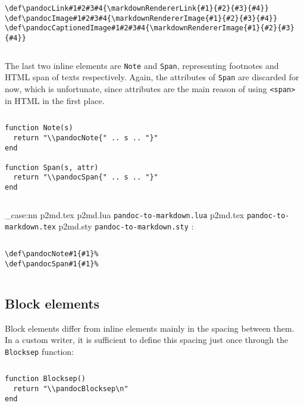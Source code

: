 \documentclass[
  digital,     %
  oneside,     %
  nosansbold,  %
  nocolorbold, %
  lof,         %
  lot,         %
]{fithesis4}
\newcommand\file[1]
  {
    \str_case:nn
      { #1 }
      {
        { p2md.lua } { \texttt{pandoc\hyp{}to\hyp{}markdown.lua} }
        { p2md.tex } { \texttt{pandoc\hyp{}to\hyp{}markdown.tex} }
        { p2md.sty } { \texttt{pandoc\hyp{}to\hyp{}markdown.sty} }
      }
  }
\begin{document}
$ $

\noindent
\lstset{language=[plain]TeX}
\begin{lstlisting}
\def\pandocLink#1#2#3#4{\markdownRendererLink{#1}{#2}{#3}{#4}}
\def\pandocImage#1#2#3#4{\markdownRendererImage{#1}{#2}{#3}{#4}}
\def\pandocCaptionedImage#1#2#3#4{\markdownRendererImage{#1}{#2}{#3}{#4}}
\end{lstlisting}

$ $

\noindent
The last two inline elements are \texttt{Note} and \texttt{Span}, representing footnotes and HTML span of texts respectively. Again, the attributes of \texttt{Span} are discarded for now, which is unfortunate, since attributes are the main reason of using \texttt{<span>} in HTML in the first place.

$ $

\noindent
\lstset{language=[5.3]Lua}
\begin{lstlisting}
function Note(s)
  return "\\pandocNote{" .. s .. "}"
end

function Span(s, attr)
  return "\\pandocSpan{" .. s .. "}"
end
\end{lstlisting}

$ $

\noindent
\file{p2md.tex}:

$ $

\noindent
\lstset{language=[plain]TeX}
\begin{lstlisting}
\def\pandocNote#1{#1}%
\def\pandocSpan#1{#1}%
\end{lstlisting}

$ $

\subsection{Block elements}

Block elements differ from inline elements mainly in the spacing between them. In a custom writer, it is sufficient to define this spacing just once through the \texttt{Blocksep} function:

$ $

\noindent
\lstset{language=[5.3]Lua}
\begin{lstlisting}
function Blocksep()
  return "\\pandocBlocksep\n"
end
\end{lstlisting}

$ $
\end{document}
